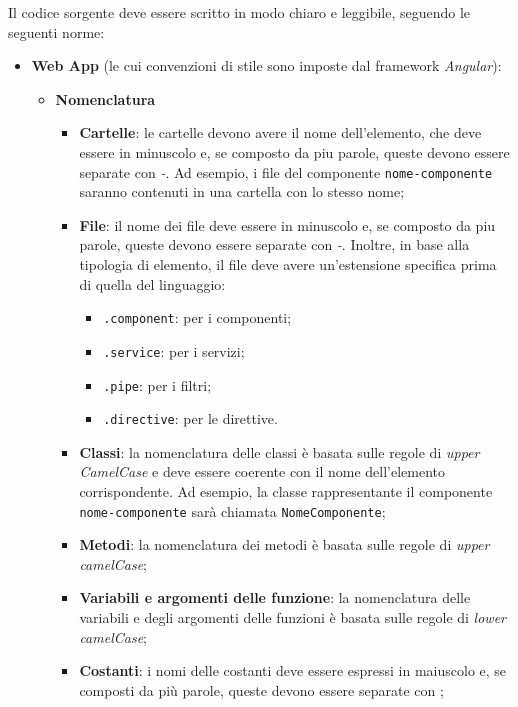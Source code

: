 \noindent Il codice sorgente deve essere scritto in modo chiaro e leggibile, seguendo le seguenti norme:
\begin{itemize}
    \item \textbf{Web App} (le cui convenzioni di stile sono imposte dal framework \textit{Angular}):
    \begin{itemize}
        \item \textbf{Nomenclatura}
        \begin{itemize}
            \item \textbf{Cartelle}: le cartelle devono avere il nome dell'elemento, che deve essere in minuscolo e, se composto da piu parole, queste devono essere separate con \textit{-}.
            Ad esempio, i file del componente \texttt{nome-componente} saranno contenuti in una cartella con lo stesso nome;
            \item \textbf{File}: il nome dei file deve essere in minuscolo e, se composto da piu parole, queste devono essere separate con \textit{-}.
            Inoltre, in base alla tipologia di elemento, il file deve avere un'estensione specifica prima di quella del linguaggio:
            \begin{itemize}
                \item \texttt{.component}: per i componenti;
                \item \texttt{.service}: per i servizi;
                \item \texttt{.pipe}: per i filtri;
                \item \texttt{.directive}: per le direttive.
            \end{itemize}
            \item \textbf{Classi}: la nomenclatura delle classi è basata sulle regole di \textit{upper CamelCase} e deve essere coerente con il nome dell'elemento corrispondente.
            Ad esempio, la classe rappresentante il componente \texttt{nome-componente} sarà chiamata \texttt{NomeComponente};
            \item \textbf{Metodi}: la nomenclatura dei metodi è basata sulle regole di \textit{upper camelCase};
            \item \textbf{Variabili e argomenti delle funzione}: la nomenclatura delle variabili e degli argomenti delle funzioni è basata sulle regole di \textit{lower camelCase};
            \item \textbf{Costanti}: i nomi delle costanti deve essere espressi in maiuscolo e, se composti da più parole, queste devono essere separate con \textit{\textunderscore};

\end{itemize}
\end{itemize}
\end{itemize}

